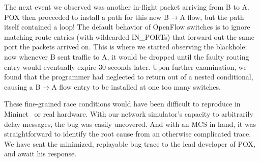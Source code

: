 The next event we observed was another in-flight packet arriving from B to
A. POX then
proceeded to install a path for this new B$\rightarrow$A flow, but the
path itself contained a loop! The default behavior of
OpenFlow switches is to ignore matching route entries (with wildcarded
IN\_PORTs) that forward out the
same port the packets arrived on. This is where we started observing the blackhole:
now whenever B sent traffic to A, it would be dropped until
the faulty routing entry would eventually expire 30 seconds later.
Upon further examination, we found that the programmer had neglected to return out
of a nested conditional, causing a B$\rightarrow$A flow entry to be
installed at one too many switches.

These fine-grained race conditions would have been difficult to reproduce
in Mininet~\cite{handigol2012reproducible} or real hardware. With our
network simulator's capacity to arbitrarily delay messages, the bug was easily uncovered. And with
an MCS in hand, it was straightforward to identify the root cause from an
otherwise complicated trace.
We have sent the minimized, replayable bug trace to the lead
developer of POX, and await his response.
